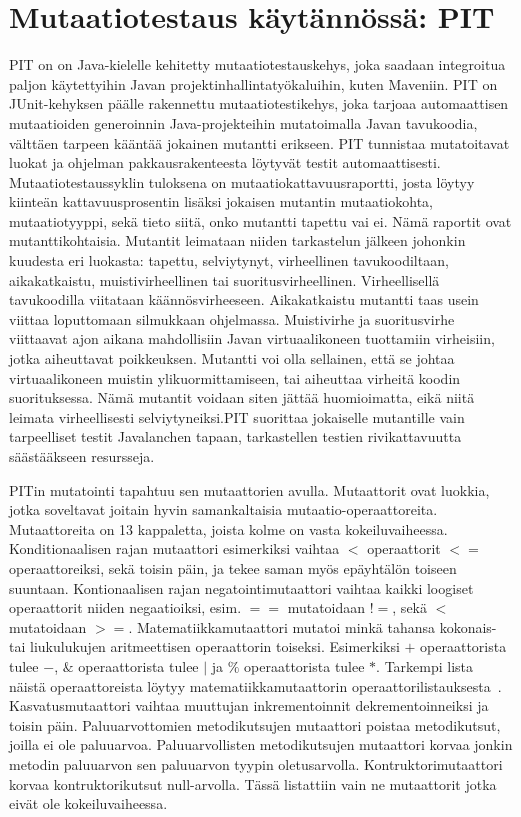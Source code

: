 \documentclass[finnish]{tktltiki2}
\begin{document}
\section{Mutaatiotestaus käytännössä: PIT}
PIT on on Java-kielelle kehitetty mutaatiotestauskehys, joka saadaan integroitua paljon käytettyihin Javan projektinhallintatyökaluihin, kuten Maveniin. PIT on JUnit-kehyksen päälle rakennettu mutaatiotestikehys, joka tarjoaa automaattisen mutaatioiden generoinnin Java-projekteihin mutatoimalla Javan tavukoodia, välttäen tarpeen kääntää jokainen mutantti erikseen. PIT tunnistaa mutatoitavat luokat ja ohjelman pakkausrakenteesta löytyvät testit automaattisesti. Mutaatiotestaussyklin tuloksena on mutaatiokattavuusraportti, josta löytyy kiinteän kattavuusprosentin lisäksi jokaisen mutantin mutaatiokohta, mutaatiotyyppi, sekä tieto siitä, onko mutantti tapettu vai ei. Nämä raportit ovat mutanttikohtaisia. Mutantit leimataan niiden tarkastelun jälkeen johonkin kuudesta eri luokasta: tapettu, selviytynyt, virheellinen tavukoodiltaan, aikakatkaistu, muistivirheellinen tai suoritusvirheellinen. Virheellisellä tavukoodilla viitataan käännösvirheeseen. Aikakatkaistu mutantti taas usein viittaa loputtomaan silmukkaan ohjelmassa. Muistivirhe ja suoritusvirhe viittaavat ajon aikana mahdollisiin Javan virtuaalikoneen tuottamiin virheisiin, jotka aiheuttavat poikkeuksen. Mutantti voi olla sellainen, että se johtaa virtuaalikoneen muistin ylikuormittamiseen, tai aiheuttaa virheitä koodin suorituksessa. Nämä mutantit voidaan siten jättää huomioimatta, eikä niitä leimata virheellisesti selviytyneiksi.PIT suorittaa jokaiselle mutantille vain tarpeelliset testit Javalanchen tapaan, tarkastellen testien rivikattavuutta säästääkseen resursseja.

PITin mutatointi tapahtuu sen mutaattorien avulla. Mutaattorit ovat luokkia, jotka soveltavat joitain hyvin samankaltaisia mutaatio-operaattoreita. Mutaattoreita on 13 kappaletta, joista kolme on vasta kokeiluvaiheessa. Konditionaalisen rajan mutaattori esimerkiksi vaihtaa $<$ operaattorit $<=$ operaattoreiksi, sekä toisin päin, ja tekee saman myös epäyhtälön toiseen suuntaan. Kontionaalisen rajan negatointimutaattori vaihtaa kaikki loogiset operaattorit niiden negaatioiksi, esim. $==$ mutatoidaan $!=$, sekä $<$ mutatoidaan $>=$. Matematiikkamutaattori mutatoi minkä tahansa kokonais- tai liukulukujen aritmeettisen operaattorin toiseksi. Esimerkiksi $+$ operaattorista tulee $-$, $\&$ operaattorista tulee $|$ ja $\%$ operaattorista tulee $*$. Tarkempi lista näistä operaattoreista löytyy matematiikkamutaattorin operaattorilistauksesta~\cite{PITMathMutations}. Kasvatusmutaattori vaihtaa muuttujan inkrementoinnit dekrementoinneiksi ja toisin päin. Paluuarvottomien metodikutsujen mutaattori poistaa metodikutsut, joilla ei ole paluuarvoa. Paluuarvollisten metodikutsujen mutaattori korvaa jonkin metodin paluuarvon sen paluuarvon tyypin oletusarvolla. Kontruktorimutaattori korvaa kontruktorikutsut null-arvolla. Tässä listattiin vain ne mutaattorit jotka eivät ole kokeiluvaiheessa.
\end{document}
